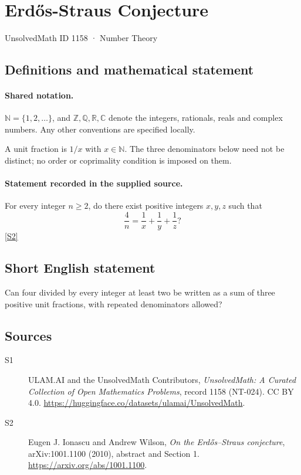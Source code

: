 \documentclass[11pt]{article}
\newcommand{\sref}[2]{\hyperlink{source:#1:#2}{[S#2]}}
\begin{document}
\setcounter{section}{1157}
\section{Erdős-Straus Conjecture}\label{1158}
{\small\sffamily UnsolvedMath ID 1158 · Number Theory}
\subsection{Definitions and mathematical statement}

\paragraph{Shared notation.}$\mathbb N=\{1,2,\ldots\}$, and $\mathbb Z,\mathbb Q,\mathbb R,\mathbb C$ denote the integers, rationals, reals and complex numbers. Any other conventions are specified locally.


A unit fraction is \(1/x\) with \(x\in\mathbb N\).
The three denominators below need not be distinct; no order or
coprimality condition is imposed on them.
\paragraph{Statement recorded in the supplied source.}
For every integer \(n\ge2\), do there exist positive integers
\(x,y,z\) such that
\[
 \frac4n=\frac1x+\frac1y+\frac1z?
\] \sref{1158}{2}
\subsection{Short English statement}
Can four divided by every integer at least two be written as a sum of three positive unit fractions, with repeated denominators allowed?
\subsection{Sources}
\begin{description}
\item[\hypertarget{source:1158:1}{S1}] ULAM.AI and the UnsolvedMath Contributors, \emph{UnsolvedMath: A Curated Collection of Open Mathematics Problems}, record 1158 (NT-024). CC BY 4.0. \url{https://huggingface.co/datasets/ulamai/UnsolvedMath}.
\item[\hypertarget{source:1158:2}{S2}] Eugen J. Ionascu and Andrew Wilson, \emph{On the Erd\H{o}s--Straus conjecture}, arXiv:1001.1100 (2010), abstract and Section 1. \url{https://arxiv.org/abs/1001.1100}.
\end{description}
\label{end:1158}
\end{document}
